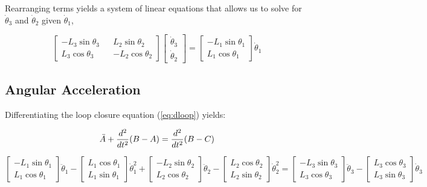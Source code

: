 \documentclass[letterpaper]{article}
\begin{document}
\noindent Rearranging terms yields a system of linear equations that allows us to solve for $\dot{\theta}_3$ and $\dot{\theta}_2$ given $\dot{\theta}_1$,

\begin{equation}
	\begin{bmatrix} -L_3 \sin \theta_3 && L_2 \sin \theta_2 \\ L_3 \cos \theta_3 && - L_2 \cos \theta_2 \end{bmatrix} \begin{bmatrix} \dot{\theta}_3 \\ \dot{\theta}_2 \end{bmatrix} = \begin{bmatrix} -L_1 \sin \theta_1 \\ L_1 \cos \theta_1 \end{bmatrix} \dot{\theta}_1
\end{equation}

\subsection{Angular Acceleration}

Differentiating the loop closure equation (\ref{eq:dloop}) yields:

\begin{equation}
	\ddot{A} + \frac{d^2}{dt^2} (B -A) = \frac{d^2}{dt^2} (B - C) \\
\end{equation}

\begin{equation}
	\begin{bmatrix} - L_1 \sin \theta_1 \\ L_1 \cos \theta_1 \end{bmatrix} \ddot{\theta}_1 - \begin{bmatrix} L_1 \cos \theta_1 \\ L_1 \sin \theta_1 \end{bmatrix} \dot{\theta}_1^2 + \begin{bmatrix} - L_2 \sin \theta_2 \\ L_2 \cos \theta_2 \end{bmatrix} \ddot{\theta}_2 - \begin{bmatrix} L_2 \cos \theta_2 \\ L_2 \sin \theta_2 \end{bmatrix} \dot{\theta}_2^2 = \begin{bmatrix} - L_3 \sin \theta_3 \\ L_3 \cos \theta_3 \end{bmatrix} \ddot{\theta}_3 - \begin{bmatrix} L_3 \cos \theta_3 \\ L_3 \sin \theta_3 \end{bmatrix} \dot{\theta}_3
\end{equation}
\end{document}
